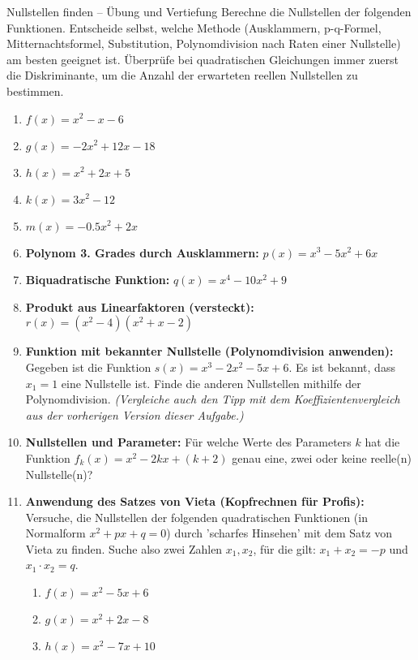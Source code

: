\begin{aufgabenumgebung}{Nullstellen finden – Übung und Vertiefung}
Berechne die Nullstellen der folgenden Funktionen. Entscheide selbst, welche Methode (Ausklammern, p-q-Formel, Mitternachtsformel, Substitution, Polynomdivision nach Raten einer Nullstelle) am besten geeignet ist. Überprüfe bei quadratischen Gleichungen immer zuerst die Diskriminante, um die Anzahl der erwarteten reellen Nullstellen zu bestimmen.
\begin{enumerate}
    \item $f(x) = x^2 - x - 6$


    \item $g(x) = -2x^2 + 12x - 18$ 


    \item $h(x) = x^2 + 2x + 5$



    \item $k(x) = 3x^2 - 12$ 


    \item $m(x) = -0.5x^2 + 2x$


    \item \textbf{Polynom 3. Grades durch Ausklammern:}
        $p(x) = x^3 - 5x^2 + 6x$


    \item \textbf{Biquadratische Funktion:}
        $q(x) = x^4 - 10x^2 + 9$


    \item \textbf{Produkt aus Linearfaktoren (versteckt):}
        $r(x) = (x^2-4)(x^2+x-2)$


    \item \textbf{Funktion mit bekannter Nullstelle (Polynomdivision anwenden):}
        Gegeben ist die Funktion $s(x) = x^3 - 2x^2 - 5x + 6$. Es ist bekannt, dass $x_1=1$ eine Nullstelle ist. Finde die anderen Nullstellen mithilfe der Polynomdivision.
        \textit{(Vergleiche auch den Tipp mit dem Koeffizientenvergleich aus der vorherigen Version dieser Aufgabe.)}

    \item \textbf{Nullstellen und Parameter:}
        Für welche Werte des Parameters $k$ hat die Funktion $f_k(x) = x^2 - 2kx + (k+2)$ genau eine, zwei oder keine reelle(n) Nullstelle(n)?

    \item \textbf{Anwendung des Satzes von Vieta (Kopfrechnen für Profis):}
        Versuche, die Nullstellen der folgenden quadratischen Funktionen (in Normalform $x^2+px+q=0$) durch 'scharfes Hinsehen' mit dem Satz von Vieta zu finden. Suche also zwei Zahlen $x_1, x_2$, für die gilt: $x_1+x_2 = -p$ und $x_1 \cdot x_2 = q$.
        \begin{enumerate}[label=(\alph*)]
            \item $f(x) = x^2 - 5x + 6$
            \item $g(x) = x^2 + 2x - 8$
            \item $h(x) = x^2 - 7x + 10$
        \end{enumerate}

\end{enumerate}

\end{aufgabenumgebung}


